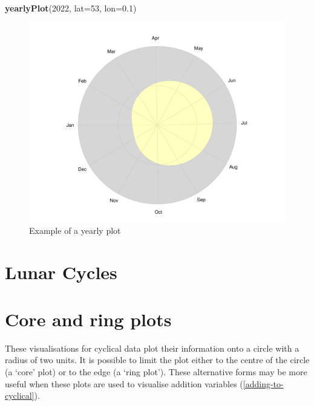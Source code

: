\documentclass[
]{book}
\newenvironment{Shaded}{\begin{snugshade}}{\end{snugshade}}
\newcommand{\AttributeTok}[1]{\textcolor[rgb]{0.13,0.29,0.53}{#1}}
\newcommand{\DecValTok}[1]{\textcolor[rgb]{0.00,0.00,0.81}{#1}}
\newcommand{\FloatTok}[1]{\textcolor[rgb]{0.00,0.00,0.81}{#1}}
\newcommand{\FunctionTok}[1]{\textcolor[rgb]{0.13,0.29,0.53}{\textbf{#1}}}
\newcommand{\NormalTok}[1]{#1}
\begin{document}
\begin{Shaded}
\begin{Highlighting}[]
\FunctionTok{yearlyPlot}\NormalTok{(}\DecValTok{2022}\NormalTok{, }\AttributeTok{lat=}\DecValTok{53}\NormalTok{, }\AttributeTok{lon=}\FloatTok{0.1}\NormalTok{)}
\end{Highlighting}
\end{Shaded}

\begin{figure}

{\centering \includegraphics[width=0.9\linewidth]{_main_files/figure-latex/yearly-plot-1-1} 

}

\caption{Example of a yearly plot}\label{fig:yearly-plot-1}
\end{figure}

\hypertarget{lunar-cycles}{%
\section{Lunar Cycles}\label{lunar-cycles}}

\hypertarget{core-and-ring-plots}{%
\section{Core and ring plots}\label{core-and-ring-plots}}

These visualisations for cyclical data plot their information onto a circle with a radius of two units. It is possible to limit the plot either to the centre of the circle (a `core' plot) or to the edge (a `ring plot'). These alternative forms may be more useful when these plots are used to visualise addition variables (\ref{adding-to-cyclical}).
\end{document}
